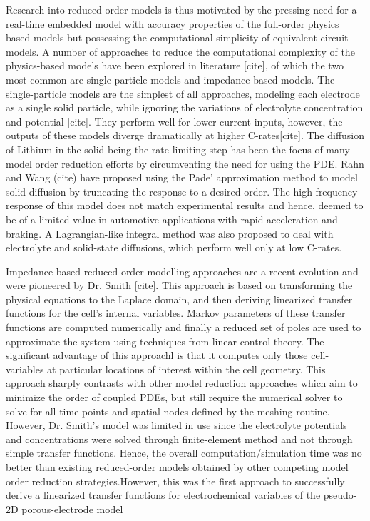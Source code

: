 Research into reduced-order models is thus  motivated by the pressing need for a
real-time  embedded model  with accuracy  properties of  the full-order  physics
based models  but possessing the computational  simplicity of equivalent-circuit
models. A  number of approaches  to reduce  the computational complexity  of the
physics-based models have  been explored in literature {[}cite{]},  of which the
two  most common  are single  particle models  and impedance  based models.  The
single-particle  models  are  the  simplest of  all  approaches,  modeling  each
electrode  as  a  single  solid  particle,  while  ignoring  the  variations  of
electrolyte concentration and potential {[}cite{]}.  They perform well for lower
current inputs,  however, the  outputs of these  models diverge  dramatically at
higher  C-rates{[}cite{]}. The  diffusion  of  Lithium in  the  solid being  the
rate-limiting step has  been the focus of many model  order reduction efforts by
circumventing the  need for using  the PDE. Rahn  and Wang (cite)  have proposed
using the Pade' approximation method to  model solid diffusion by truncating the
response to a desired order. The  high-frequency response of this model does not
match  experimental results  and  hence, deemed  to  be of  a  limited value  in
automotive applications  with rapid acceleration and  braking. A Lagrangian-like
integral  method was  also proposed  to  deal with  electrolyte and  solid-state
diffusions, which perform well only at low C-rates.

Impedance-based reduced  order modelling approaches  are a recent  evolution and
were pioneered by  Dr. Smith {[}cite{]}. This approach is  based on transforming
the  physical equations  to the  Laplace  domain, and  then deriving  linearized
transfer functions for the cell's internal variables. Markov parameters of these
transfer functions are  computed numerically and finally a reduced  set of poles
are used to approximate the system  using techniques from linear control theory.
The  significant advantage  of this  approachl is  that it  computes only  those
cell-variables at  particular locations  of interest  within the  cell geometry.
This approach sharply contrasts with  other model reduction approaches which aim
to  minimize  the  order  of  coupled PDEs,  but  still  require  the  numerical
solver  to  solve  for  all  time  points  and  spatial  nodes  defined  by  the
meshing  routine.  However, Dr.  Smith\textquoteright  s  model was  limited  in
use  since the  electrolyte potentials  and concentrations  were solved  through
finite-element  method and  not through  simple transfer  functions. Hence,  the
overall computation/simulation  time was  no better than  existing reduced-order
models  obtained by  other competing  model order  reduction strategies.However,
this  was  the first  approach  to  successfully  derive a  linearized  transfer
functions for electrochemical variables of the pseudo-2D porous-electrode model

